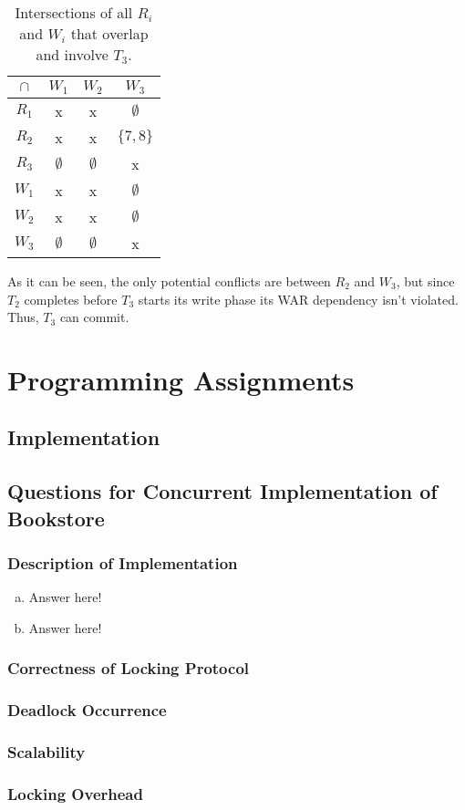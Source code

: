 \documentclass[11pt,a4paper,english]{article}
\begin{document}
\begin{table}[!hbt]
\centering
\begin{tabular}{|c|c|c|c|}
\hline
$\cap$  & $W_{1}$ & $W_{2}$ & $W_{3}$    \\ \hline
$R_{1}$ & x  & x  & $\emptyset$ \\ \hline
$R_{2}$ & x  & x  & $\{7,8\}$ \\ \hline
$R_{3}$ & $\emptyset$ & $\emptyset$ & x \\ \hline
$W_{1}$ & x  & x  & $\emptyset$ \\ \hline
$W_{2}$ & x  & x  & $\emptyset$ \\ \hline
  $W_{3}$ & $\emptyset$ & $\emptyset$ & x \\ \hline
\end{tabular}
\caption{Intersections of all $R_{i}$ and $W_{i}$ that overlap and involve $T_{3}$.}
\label{tbl:scenario3}
\end{table}

As it can be seen, the only potential conflicts are between $R_2$ and $W_3$, but
since $T_2$ completes before $T_3$ starts its write phase its WAR dependency
isn't violated. Thus, $T_3$ can commit.

\section{Programming Assignments}
\subsection{Implementation}

\subsection{Questions for Concurrent Implementation of Bookstore}
\subsubsection{Description of Implementation}
\begin{enumerate}[(a)]
\item{Answer here!}
\item{Answer here!}
\end{enumerate}

\subsubsection{Correctness of Locking Protocol}
\subsubsection{Deadlock Occurrence}
\subsubsection{Scalability}
\subsubsection{Locking Overhead}
\end{document}

